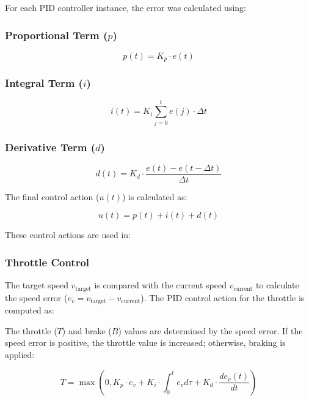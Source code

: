 \documentclass[conference]{IEEEtran}
\begin{document}
For each PID controller instance, the error was calculated using:

\subsubsection{Proportional Term ($p$)}

\begin{equation}
p(t) = K_p \cdot e(t)
\end{equation}

\subsubsection{Integral Term ($i$)}

\begin{equation}
i(t) = K_i \sum_{j=0}^{t} e(j) \cdot \Delta t
\end{equation}

\subsubsection{Derivative Term ($d$)}

\begin{equation}
d(t) = K_d \cdot \frac{e(t) - e(t-\Delta t)}{\Delta t}
\end{equation}

The final control action ($u(t)$) is calculated as:

\begin{equation}
u(t) = p(t) + i(t) + d(t)
\end{equation}

These control actions are used in:

\subsubsection{Throttle Control}
The target speed $v_{\text{target}}$ is compared with the current speed $v_{\text{current}}$ to calculate the speed error ($e_v = v_{\text{target}} - v_{\text{current}}$). The PID control action for the throttle is computed as:

The throttle ($T$) and brake ($B$) values are determined by the speed error. If the speed error is positive, the throttle value is increased; otherwise, braking is applied:

\begin{equation}
T = \max(0, K_p \cdot e_v + K_i \cdot \int_{0}^{t} e_v d\tau + K_d \cdot \frac{de_v(t)}{dt})
\end{equation}
\end{document}
